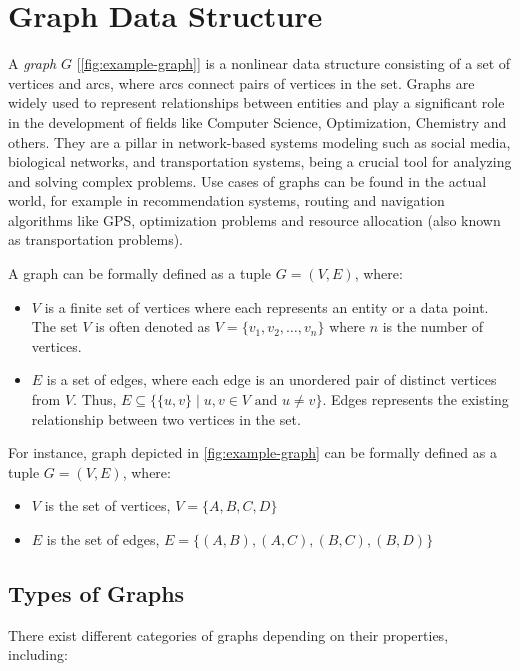 \documentclass[../Thesis.tex]{subfiles}
\begin{document}
	
	\chapter{Graph Data Structure}
	\label{sec:graph_data_structure}
	
	A \emph{graph} $G$ [\autoref{fig:example-graph}] is a nonlinear data structure consisting of a set of vertices and arcs, where arcs connect pairs of vertices in the set. Graphs are widely used to represent relationships between entities and play a significant role in the development of fields like Computer Science, Optimization, Chemistry and others. They are a pillar in network-based systems modeling such as social media, biological networks, and transportation systems, being a crucial tool for analyzing and solving complex problems. Use cases of graphs can be found in the actual world, for example in recommendation systems, routing and navigation algorithms like GPS, optimization problems and resource allocation (also known as transportation problems).
	
	
	
	A graph can be formally defined as a tuple $G = (V, E)$, where:
	\begin{itemize}
		\item $V$ is a finite set of vertices where each represents an entity or a data point. The set $V$ is often denoted as $V = \{v_1, v_2, \ldots, v_n\}$ where $n$ is the number of vertices.
		\item $E$ is a set of edges, where each edge is an unordered pair of distinct vertices from $V$. Thus, $E \subseteq \{\{u, v\} \mid u, v \in V \text{ and } u \neq v\}$. Edges represents the existing relationship between two vertices in the set.
	\end{itemize}
	
	For instance, graph depicted in \autoref{fig:example-graph} can be formally defined as a tuple \( G = (V, E) \), where:
	\begin{itemize}
		\item \( V \) is the set of vertices, \( V = \{A, B, C, D\} \)
		\item \( E \) is the set of edges, \( E = \{(A, B), (A, C), (B, C), (B, D)\} \)
	\end{itemize}
	
	\section{Types of Graphs}
	There exist different categories of graphs depending on their properties, including:
	
\end{document}
